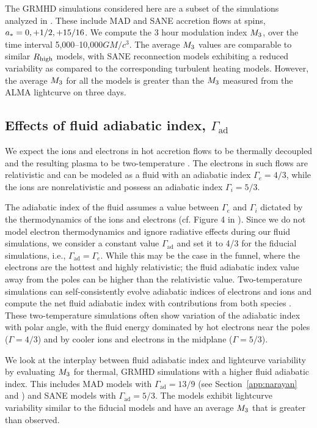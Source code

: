 The GRMHD simulations considered here are a subset of the simulations analyzed in \citealt{2020MNRAS.494.4168D}. These include MAD and SANE accretion flows at spins, $a_* = 0,+1/2,+15/16$. We compute the 3 hour modulation index $M_{3}$, over the time interval 5,000--10,000$GM/c^{3}$. The average $M_{3}$ values are comparable to similar $R_\mathrm{high}$ models, with SANE reconnection models exhibiting a reduced variability as compared to the corresponding turbulent heating models. However, the average $M_{3}$ for all the models is greater than the $M_{3}$ measured from the ALMA lightcurve on three days.

\subsection{Effects of fluid adiabatic index, \texorpdfstring{$\Gamma_\mathrm{ad}$}{Gad}}

We expect the ions and electrons in hot accretion flows to be thermally decoupled and the resulting plasma to be two-temperature \citep{1976ApJ...204..187S, Quataert_1998, 10.1093/mnras/stw3116, Ryan_2018, Chael2018}. The electrons in such flows are relativistic and can be modeled as a fluid with an adiabatic index $\Gamma_{e}=4/3$, while the ions are nonrelativistic and possess an adiabatic index $\Gamma_{i}=5/3$.

The adiabatic index of the fluid assumes a value between $\Gamma_{e}$ and $\Gamma_{i}$ dictated by the thermodynamics of the ions and electrons (cf. Figure 4 in \citealt{10.1093/mnras/stw3116}). Since we do not model electron thermodynamics and ignore radiative effects during our fluid simulations, we consider a constant value $\Gamma_\mathrm{ad}$ and set it to 4/3 for the fiducial simulations, i.e., $\Gamma_\mathrm{ad}=\Gamma_{e}$. While this may be the case in the funnel, where the electrons are the hottest and highly relativistic; the fluid adiabatic index value away from the poles can be higher than the relativistic value.
Two-temperature simulations can self-consistently evolve adiabatic indices of electrons and ions and compute the net fluid adiabatic index with contributions from both species \cite{10.1093/mnras/stw3116}. These two-temperature simulations often show variation of the adiabatic index with polar angle, with the fluid energy dominated by hot electrons near the poles ($\Gamma = 4/3$) and by cooler ions and  electrons in the midplane ($\Gamma=5/3$).

We look at the interplay between fluid adiabatic index and lightcurve variability by evaluating $M_{3}$ for thermal, GRMHD simulations with a higher fluid adiabatic index. This includes MAD models with $\Gamma_\mathrm{ad}=13/9$ (see Section~\ref{app:narayan} and  \citealt{2021arXiv210812380N}) and SANE models with $\Gamma_\mathrm{ad}=5/3$. The models exhibit lightcurve variability similar to the fiducial models and have an average $M_{3}$ that is greater than observed.
